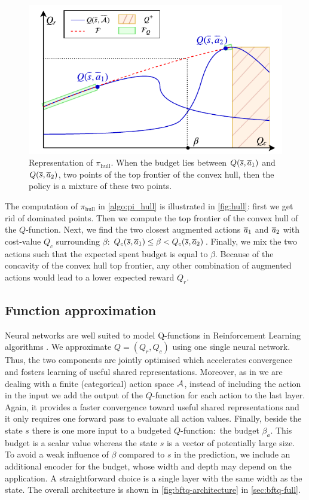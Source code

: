 \begin{figure}[ht]
	\centering
	\includegraphics[width=0.6\linewidth]{img/pi.pdf}
	\caption{Representation of $\pi_\text{hull}$. When the budget lies between $Q(\overline{s},\overline{a}_1)$ and $Q(\overline{s},\overline{a}_2)$, two points of the top frontier of the convex hull, then the policy is a mixture of these two points.}
	\label{fig:hull}
\end{figure}

The computation of $\pi_\text{hull}$ in \autoref{algo:pi_hull} is illustrated in \autoref{fig:hull}: first we get rid of dominated points. Then we compute the top frontier of the convex hull of the $Q$-function. Next, we find the two closest augmented actions $\overline{a}_1$ and $\overline{a}_2$ with cost-value $Q_c$ surrounding $\beta$:  $Q_c(\overline{s},\overline{a}_1)\leq\beta<Q_c(\overline{s},\overline{a}_2)$. Finally, we mix the two actions such that the expected spent budget is equal to $\beta$. Because of the concavity of the convex hull top frontier, any other combination of augmented actions would lead to a lower expected reward $Q_r$. 




\subsection{Function approximation}

Neural networks are well suited to model Q-functions in Reinforcement Learning algorithms \citep{Riedmiller2005,Mnih2015}.  We approximate $Q = (Q_r, Q_c)$ using one single neural network. Thus, the two components are jointly optimised which accelerates convergence and fosters learning of useful shared representations. Moreover, as in \citep{Mnih2015} we are dealing with a finite (categorical) action space $\mathcal{A}$, instead of including the action in the input we add the output of the $Q$-function for each action to the last layer. Again, it provides a faster convergence toward useful shared representations and it only requires one forward pass to evaluate all action values. Finally, beside the state $s$ there is one more input to a budgeted $Q$-function:~the budget $\beta_a$. This budget is a scalar value whereas the state $s$ is a vector of potentially large size. To avoid a weak influence of $\beta$ compared to $s$ in the prediction, we include an additional encoder for the budget, whose width and depth may depend on the application. A straightforward choice is a single layer with the same width as the state. The overall architecture is shown in \autoref{fig:bftq-architecture} in \autoref{sec:bftq-full}.

